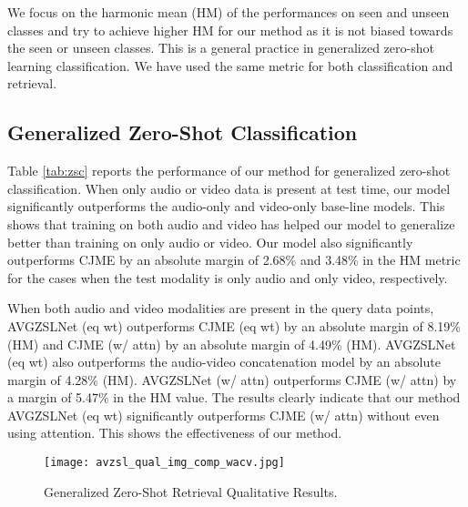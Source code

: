 \documentclass[10pt,twocolumn,letterpaper]{article}
\begin{document}
We focus on the harmonic mean (HM) of the performances on seen and unseen classes and try to achieve higher HM for our method as it is not biased towards the seen or unseen classes. This is a general practice in generalized zero-shot learning classification. We have used the same metric for both classification and retrieval.

\subsection{Generalized Zero-Shot Classification}


Table \ref{tab:zsc} reports the performance of our method for generalized zero-shot classification. When only audio or video data is present at test time, our model significantly outperforms the audio-only and video-only base-line models. This shows that training on both audio and video has helped our model to generalize better than training on only audio or video. Our model also significantly outperforms CJME by an absolute margin of 2.68\% and 3.48\% in the HM metric for the cases when the test modality is only audio and only video, respectively.

When both audio and video modalities are present in the query data points, AVGZSLNet (eq wt) outperforms CJME (eq wt) by an absolute margin of 8.19\% (HM) and CJME (w/ attn) by an absolute margin of 4.49\% (HM). AVGZSLNet (eq wt) also outperforms the audio-video concatenation model by an absolute margin of 4.28\% (HM). AVGZSLNet (w/ attn) outperforms CJME (w/ attn) by a margin of 5.47\% in the HM value. The results clearly indicate that our method AVGZSLNet (eq wt) significantly outperforms CJME (w/ attn) without even using attention. This shows the effectiveness of our method.


\begin{figure*}[t]
  \centering
  \texttt{[image: avzsl\_qual\_img\_comp\_wacv.jpg]}
  \caption{Generalized Zero-Shot Retrieval Qualitative Results.}
  \label{fig:qual}
  \vspace{-15pt}
\end{figure*}
\end{document}
